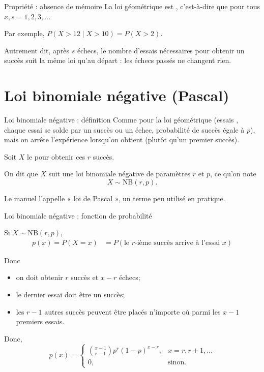 \documentclass{BeamerTemplate}
\begin{document}
\begin{frame}{Propriété : absence de mémoire}
La loi géométrique est , c'est-à-dire que
pour tous $x,s=1,2,3,\ldots$

\smallskip
Par exemple, $P(X>12\mid X>10)=P(X>2)$.

\vspace{0.2in}
Autrement dit, après $s$ échecs, le nombre d'essais  nécessaires pour obtenir un succès suit la même loi qu'au départ : les échecs passés ne changent rien.

\end{frame}

\section{Loi binomiale négative (Pascal)}

\begin{frame}[t]{Loi binomiale négative : définition}
Comme pour la loi géométrique (essais , chaque essai se solde
par un succès ou un échec, probabilité de succès  égale à
$p$), mais on arrête l'expérience lorsqu'on obtient 
(plutôt qu'un premier succès).

\medskip
Soit $X$ le  pour obtenir
ces $r$ succès.

\bigskip
On dit que $X$ suit une loi binomiale négative de paramètres $r$ et $p$, ce qu'on note
$$X\sim \text{NB}(r,p).$$

Le manuel l'appelle « loi de Pascal », un terme peu utilisé en pratique.
\end{frame}

\begin{frame}{Loi binomiale négative : fonction de probabilité}

Si $X\sim\text{NB}(r,p)$,
\begin{align*}
p(x) = P(X=x) &= P(\mbox{le $r$-ième succès arrive à l'essai $x$})
\end{align*}

Donc
\begin{itemize}
\item on doit obtenir $r$ succès et $x-r$ échecs;
\item le dernier essai doit être un succès;
\item les $r-1$ autres succès peuvent être placés n'importe où parmi les $x-1$ premiers essais.
\end{itemize}


\vspace{0.1in}
Donc,
$$p(x)=\left\{\begin{array}{ll}
{x-1\choose r-1}p^r(1-p)^{x-r}, & x=r,r+1,\ldots\\
0, & \text{sinon}.
\end{array}\right.$$

\end{frame}
\end{document}
